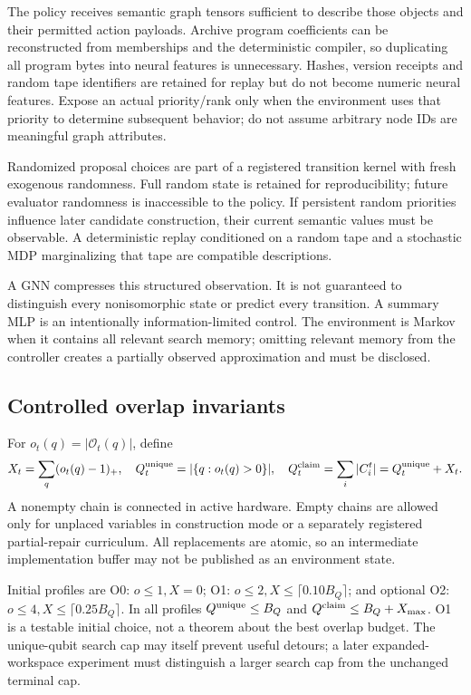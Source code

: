 The policy receives semantic graph tensors sufficient to describe those objects and their permitted action payloads. Archive program coefficients can be reconstructed from memberships and the deterministic compiler, so duplicating all program bytes into neural features is unnecessary. Hashes, version receipts and random tape identifiers are retained for replay but do not become numeric neural features. Expose an actual priority/rank only when the environment uses that priority to determine subsequent behavior; do not assume arbitrary node IDs are meaningful graph attributes.

Randomized proposal choices are part of a registered transition kernel with fresh exogenous randomness. Full random state is retained for reproducibility; future evaluator randomness is inaccessible to the policy. If persistent random priorities influence later candidate construction, their current semantic values must be observable. A deterministic replay conditioned on a random tape and a stochastic MDP marginalizing that tape are compatible descriptions.

A GNN compresses this structured observation. It is not guaranteed to distinguish every nonisomorphic state or predict every transition. A summary MLP is an intentionally information-limited control. The environment is Markov when it contains all relevant search memory; omitting relevant memory from the controller creates a partially observed approximation and must be disclosed.

\subsection{Controlled overlap invariants}
For $o_t(q)=|\mathcal O_t(q)|$, define
\begin{equation}
X_t=\sum_q(o_t(q)-1)_+,\quad
Q_t^{\rm unique}=|\{q:o_t(q)>0\}|,\quad
Q_t^{\rm claim}=\sum_i|C_i^t|=Q_t^{\rm unique}+X_t.
\end{equation}
A nonempty chain is connected in active hardware. Empty chains are allowed only for unplaced variables in construction mode or a separately registered partial-repair curriculum. All replacements are atomic, so an intermediate implementation buffer may not be published as an environment state.

Initial profiles are O0: $o\le1,X=0$; O1: $o\le2,X\le\lceil0.10B_Q\rceil$; and optional O2: $o\le4,X\le\lceil0.25B_Q\rceil$. In all profiles $Q^{\rm unique}\le B_Q$ and $Q^{\rm claim}\le B_Q+X_{\max}$. O1 is a testable initial choice, not a theorem about the best overlap budget. The unique-qubit search cap may itself prevent useful detours; a later expanded-workspace experiment must distinguish a larger search cap from the unchanged terminal cap.

